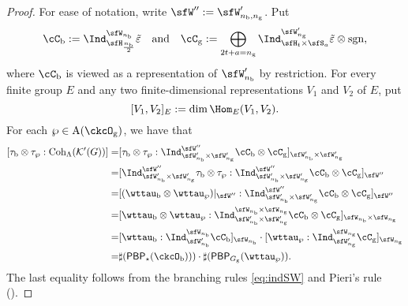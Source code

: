 \documentclass[12pt]{amsart}
\newcommand{\CK}{{\mathcal {K}}}
\newcommand{\sgn}{\operatorname{sgn}}
\numberwithin{equation}{section}
\theoremstyle{remark}
\def\Coh{\mathrm{Coh}}
\def\PBP{\mathsf{PBP}}
\def\ckcOb{\ckcO_{\mathrm b}}
\def\ckcOg{\ckcO_{\mathrm g}}
\def\Gg{G_{\mathrm g}}
\begin{document}
\begin{proof}
  For ease of notation, write $\sfW'':=\sfW_{n_{\mathrm b},n_{\mathrm g}}'$. Put
  \[
    \cC_{\mathrm b}:=   \Ind_{\sfH_{\frac{n_\mathrm b}{2}}}^{\sfW_{n_\mathrm b}}\tilde{\varepsilon} \quad\textrm{and}\quad  \cC_\mathrm g:=  \bigoplus_{\substack{2t+a=n_\mathrm g}} \Ind_{\sfH_{t} \times \sfS_{a}}^{\sfW'_{n_\mathrm g}}
         \tilde{\varepsilon} \otimes \sgn,
           \]
           where $\cC_\mathrm b$ is viewed as a representation of $\sfW_{n_\mathrm b}'$ by restriction.
   For every finite group $E$ and any  two finite-dimensional  representations $V_1$ and $V_2$ of $E$, put
  \[
    [V_1, V_2]_E:=\dim \Hom_E(V_1, V_2).
  \]
   For each $\wp\in \mathrm A (\ckcOg)$, we have that
  \[
    \begin{split}
    [\tau_{\mathrm b}\otimes \tau_{\wp}: \Coh_{\Lambda} (\CK'(G))]
      = & [\tau_{\mathrm b}\otimes \tau_{\wp} :
      \Ind_{\sfW'_{n_{\mathrm b}}\times \sfW'_{n_{\mathrm g}}}^{\sfW''} \cC_{\mathrm b} \otimes \cC_{\mathrm g}]_{\sfW'_{n_{\mathrm b}}\times \sfW'_{n_{\mathrm g}}}\\
      = & [\Ind_{\sfW'_{n_{\mathrm b}}\times \sfW'_{n_{\mathrm g}}}^{\sfW''} \tau_{\mathrm b}\otimes \tau_{\wp} :
      \Ind_{\sfW'_{n_{\mathrm b}}\times \sfW'_{n_{\mathrm g}}}^{\sfW''} \cC_{\mathrm b} \otimes \cC_{\mathrm g}]_{\sfW''}\\
      = & [(\wttau_{\mathrm b}\otimes \wttau_{\wp})|_{\sfW''}:
      \Ind_{\sfW'_{n_{\mathrm b}}\times \sfW'_{n_{\mathrm g}}}^{\sfW''} \cC_{\mathrm b} \otimes \cC_{\mathrm g}]_{\sfW''}\\
      = & [\wttau_{\mathrm b}\otimes \wttau_{\wp}:
      \Ind_{\sfW'_{n_{\mathrm b}}\times \sfW'_{n_{\mathrm g}}}^{\sfW_{n_{\mathrm b}}\times \sfW_{n_{\mathrm g}}} \cC_{\mathrm b} \otimes \cC_{\mathrm g}]_{\sfW_{n_{\mathrm b}}\times \sfW_{n_{\mathrm g}}}\\
       = & [\wttau_{\mathrm b}:\Ind_{\sfW'_{n_{\mathrm b}}}^{\sfW_{n_{\mathrm b}}} \cC_{\mathrm b}]_{\sfW_{n_{\mathrm b}}}\cdot
           [\wttau_{\wp}:\Ind_{\sfW'_{n_{\mathrm g}}}^{\sfW_{n_{\mathrm g}}} \cC_{\mathrm g}]_{\sfW_{n_{\mathrm g}}}\\
      =& \sharp(\PBP_{\star}(\ckcOb)))\cdot \sharp(\PBP_{\Gg}(\wttau_{\wp})).
    \end{split}
  \]
  The last equality follows from the branching rules
  \eqref{eq:indSW} and
  Pieri's rule (\cite[Corollary 9.2.4]{GW}).
\end{proof}
\end{document}
